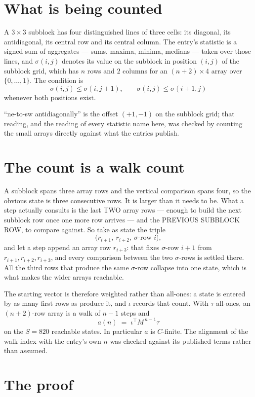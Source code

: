 \documentclass[11pt,a4paper]{article}
\theoremstyle{plain}
\theoremstyle{definition}
\begin{document}
\section{What is being counted}

A $3\times3$ subblock has four distinguished lines of three cells: its diagonal, its
antidiagonal, its central row and its central column. The entry's statistic is a signed sum of
aggregates --- sums, maxima, minima, medians --- taken over those lines, and $\sigma(i,j)$
denotes its value on the subblock in position $(i,j)$ of the subblock grid, which has $n$ rows
and $2$ columns for an $(n+2)\times4$ array over $\{0,\dots,1\}$. The condition is
\[
\sigma(i,j)\le\sigma(i,j+1),\qquad \sigma(i,j)\le\sigma(i+1,j)
\]
whenever both positions exist.

``ne-to-sw antidiagonally'' is the offset $(+1,-1)$ on the subblock grid; that reading, and
the reading of every statistic name here, was checked by counting the small arrays directly
against what the entries publish.

\section{The count is a walk count}

A subblock spans three array rows and the vertical comparison spans four, so the obvious state
is three consecutive rows. It is larger than it needs to be. What a step actually consults is
the last TWO array rows --- enough to build the next subblock row once one more row arrives ---
and the PREVIOUS SUBBLOCK ROW, to compare against. So take as state the triple
\[
\bigl(r_{i+1},\ r_{i+2},\ \sigma\text{-row }i\bigr),
\]
and let a step append an array row $r_{i+3}$: that fixes $\sigma$-row $i+1$ from
$r_{i+1},r_{i+2},r_{i+3}$, and every comparison between the two $\sigma$-rows is settled
there. All the third rows that produce the same $\sigma$-row collapse into one state, which is
what makes the wider arrays reachable.

The starting vector is therefore weighted rather than all-ones: a state is entered by as many
first rows as produce it, and $\iota$ records that count. With $\tau$ all-ones, an
$(n+2)$-row array is a walk of $n-1$ steps and
\[
a(n)\;=\;\iota^{\!\top}M^{\,n-1}\tau
\]
on the $S=820$ reachable states. In particular $a$ is $C$-finite. The alignment of the walk
index with the entry's own $n$ was checked against its published terms rather than assumed.

\section{The proof}
\end{document}
